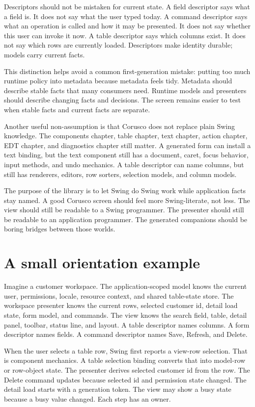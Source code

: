 Descriptors should not be mistaken for current state. A field descriptor says what a field is. It does not say what the user typed today. A command descriptor says what an operation is called and how it may be presented. It does not say whether this user can invoke it now. A table descriptor says which columns exist. It does not say which rows are currently loaded. Descriptors make identity durable; models carry current facts.

This distinction helps avoid a common first-generation mistake: putting too much runtime policy into metadata because metadata feels tidy. Metadata should describe stable facts that many consumers need. Runtime models and presenters should describe changing facts and decisions. The screen remains easier to test when stable facts and current facts are separate.

Another useful non-assumption is that Corusco does not replace plain Swing knowledge. The components chapter, table chapter, text chapter, action chapter, EDT chapter, and diagnostics chapter still matter. A generated form can install a text binding, but the text component still has a document, caret, focus behavior, input methods, and undo mechanics. A table descriptor can name columns, but  still has renderers, editors, row sorters, selection models, and column models.

The purpose of the library is to let Swing do Swing work while application facts stay named. A good Corusco screen should feel more Swing-literate, not less. The view should still be readable to a Swing programmer. The presenter should still be readable to an application programmer. The generated companions should be boring bridges between those worlds.

\section{A small orientation example}

Imagine a customer workspace. The application-scoped model knows the current user, permissions, locale, resource context, and shared table-state store. The workspace presenter knows the current rows, selected customer id, detail load state, form model, and commands. The view knows the search field, table, detail panel, toolbar, status line, and layout. A table descriptor names columns. A form descriptor names fields. A command descriptor names Save, Refresh, and Delete.

When the user selects a table row, Swing first reports a view-row selection. That is component mechanics. A table selection binding converts that into model-row or row-object state. The presenter derives selected customer id from the row. The Delete command updates because selected id and permission state changed. The detail load starts with a generation token. The view may show a busy state because a busy value changed. Each step has an owner.

